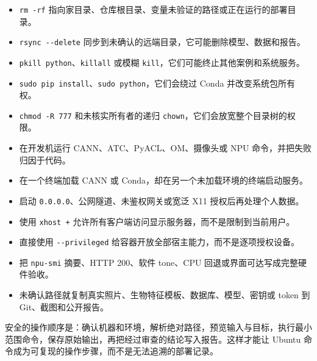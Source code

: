 \begin{itemize}
\tightlist
\item
  \passthrough{\lstinline!rm -rf!}
  指向家目录、仓库根目录、变量未验证的路径或正在运行的部署目录。
\item
  \passthrough{\lstinline!rsync --delete!}
  同步到未确认的远端目录，它可能删除模型、数据和报告。
\item
  \passthrough{\lstinline!pkill python!}、\passthrough{\lstinline!killall!}
  或模糊
  \passthrough{\lstinline!kill!}，它们可能终止其他案例和系统服务。
\item
  \passthrough{\lstinline!sudo pip install!}、\passthrough{\lstinline!sudo python!}，它们会绕过
  Conda 并改变系统包所有权。
\item
  \passthrough{\lstinline!chmod -R 777!} 和未核实所有者的递归
  \passthrough{\lstinline!chown!}，它们会放宽整个目录树的权限。
\item
  在开发机运行 CANN、ATC、PyACL、OM、摄像头或 NPU
  命令，并把失败归因于代码。
\item
  在一个终端加载 CANN 或 Conda，却在另一个未加载环境的终端启动服务。
\item
  启动 \passthrough{\lstinline!0.0.0.0!}、公网隧道、未鉴权网关或宽泛 X11
  授权后再处理个人数据。
\item
  使用 \passthrough{\lstinline!xhost +!}
  允许所有客户端访问显示服务器，而不是限制到当前用户。
\item
  直接使用 \passthrough{\lstinline!--privileged!}
  给容器开放全部宿主能力，而不是逐项授权设备。
\item
  把 \passthrough{\lstinline!npu-smi!} 摘要、HTTP 200、软件 tone、CPU
  回退或界面可达写成完整硬件验收。
\item
  未确认路径就复制真实照片、生物特征模板、数据库、模型、密钥或 token 到
  Git、截图和公开报告。
\end{itemize}

安全的操作顺序是：确认机器和环境，解析绝对路径，预览输入与目标，执行最小范围命令，保存原始输出，再把经过审查的结论写入报告。这样才能让
Ubuntu 命令成为可复现的操作步骤，而不是无法追溯的部署记录。
